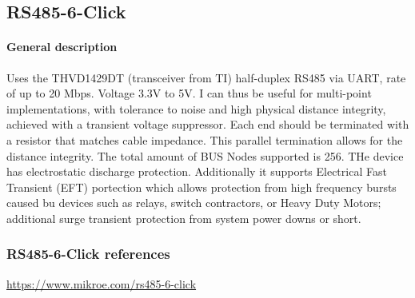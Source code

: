 \subsection{RS485-6-Click}
\paragraph{General description} Uses the THVD1429DT (transceiver from TI) half-duplex RS485 via UART, rate of up to 20 Mbps. Voltage 3.3V to 5V. I can thus be useful for multi-point implementations, with tolerance to noise and  high physical distance integrity, achieved with a transient voltage suppressor. Each end should be terminated with a resistor that matches cable impedance. This parallel termination allows for the distance integrity. The total amount of BUS Nodes supported is 256. THe device has electrostatic discharge protection. Additionally it supports Electrical Fast Transient (EFT) portection which allows protection from high frequency bursts caused bu devices such as relays, switch contractors, or Heavy Duty Motors; additional surge transient protection from system power downs or short. 

\subsubsection{RS485-6-Click references}
\url{https://www.mikroe.com/rs485-6-click}